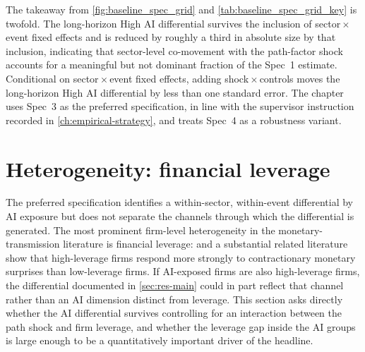 The takeaway from \cref{fig:baseline_spec_grid} and
\cref{tab:baseline_spec_grid_key} is twofold. The long-horizon High AI
differential survives the inclusion of sector\,$\times$\,event fixed
effects and is reduced by roughly a third in absolute size by that
inclusion, indicating that sector-level co-movement with the path-factor
shock accounts for a meaningful but not dominant fraction of the Spec~1
estimate. Conditional on sector\,$\times$\,event fixed effects, adding
shock\,$\times$\,controls moves the long-horizon High AI differential by
less than one standard error. The chapter uses Spec~3 as the preferred
specification, in line with the supervisor instruction recorded in
\cref{ch:empirical-strategy}, and treats Spec~4 as a robustness variant.

\section{Heterogeneity: financial leverage}
\label{sec:res-heterogeneity}
 
The preferred specification identifies a within-sector, within-event
differential by AI exposure but does not separate the channels
through which the differential is generated. The most prominent
firm-level heterogeneity in the monetary-transmission literature is
financial leverage: \citet{ottonelloWinberry2020} and a substantial
related literature show that high-leverage firms respond more
strongly to contractionary monetary surprises than low-leverage
firms. If AI-exposed firms are also high-leverage firms, the
differential documented in \cref{sec:res-main} could in part reflect
that channel rather than an AI dimension distinct from leverage.
This section asks directly whether the AI differential survives
controlling for an interaction between the path shock and firm
leverage, and whether the leverage gap inside the AI groups is
large enough to be a quantitatively important driver of the
headline.
 
